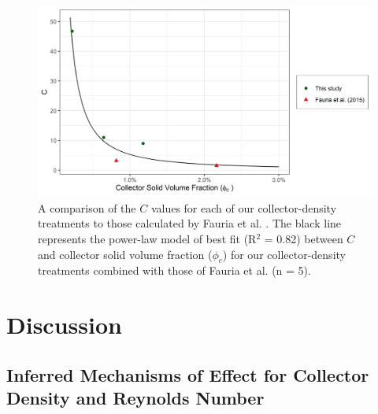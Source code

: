 \documentclass[geosciences,article,submit,moreauthors,pdftex]{Definitions/mdpi}
\begin{document}
\begin{figure}[H]
\centering
\includegraphics[width=5in]{../pics/cphiplot.png}
\caption{A comparison of the $C$ values for each of our collector-density treatments to those calculated by Fauria et al. \cite{Fauria_2015}. The black line represents the power-law model of best fit (R$^2$ = 0.82) between $C$ and collector solid volume fraction ($\phi_c$) for our collector-density treatments combined with those of Fauria et al. (n = 5).}
\label{fig:cphi}
\end{figure}   

\section{Discussion}

\subsection{Inferred Mechanisms of Effect for Collector Density and Reynolds Number}
\end{document}
